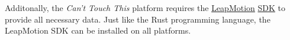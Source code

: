 \documentclass[a4paper]{article}
\begin{document}
  Additonally, the \textit{Can't Touch This} platform requires the
  \href{https://www.leapmotion.com/}{LeapMotion}
  \href{https://developer.leapmotion.com/sdk/v2}{SDK} to provide all necessary
  data. Just like the Rust programming language, the LeapMotion SDK can be
  installed on all platforms.
  \clearpage





\end{document}
